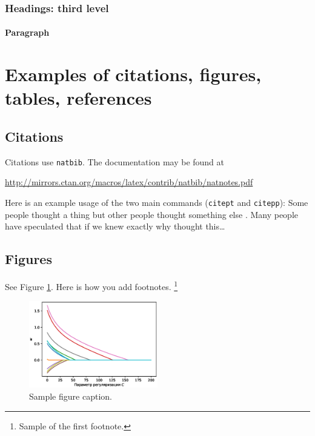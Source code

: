 \documentclass{article}
\begin{document}
\subsubsection{Headings: third level}
\lipsum[6]

\paragraph{Paragraph}
\lipsum[7]



\section{Examples of citations, figures, tables, references}
\label{sec:others}

\subsection{Citations}
Citations use \verb+natbib+. The documentation may be found at
\begin{center}
	\url{http://mirrors.ctan.org/macros/latex/contrib/natbib/natnotes.pdf}
\end{center}

Here is an example usage of the two main commands (\verb+citept+ and \verb+citepp+): Some people thought a thing  but other people thought something else . Many people have speculated that if we knew exactly why  thought this\dots

\subsection{Figures}
\lipsum[10]
See Figure \ref{fig:fig1}. Here is how you add footnotes. \footnote{Sample of the first footnote.}
\lipsum[11]

\begin{figure}
	\centering
	\includegraphics[width=0.5\textwidth]{../figures/log_reg_cs_exp.eps}
	\caption{Sample figure caption.}
	\label{fig:fig1}
\end{figure}
\end{document}

